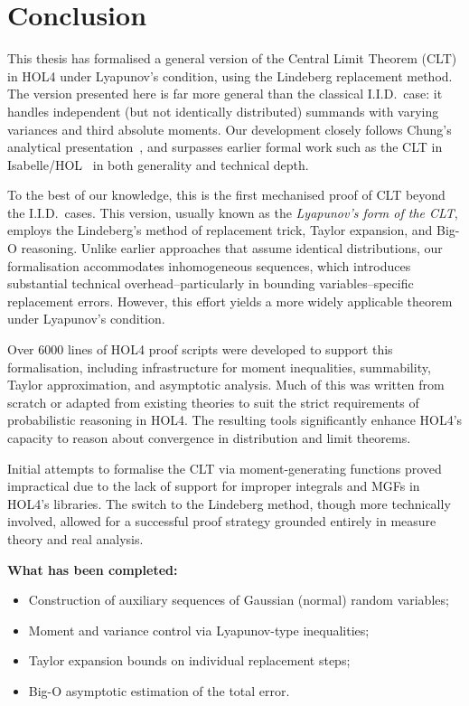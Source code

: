\chapter{Conclusion}
\label{concl}

This thesis has formalised a general version of the Central Limit Theorem (CLT) in HOL4 under Lyapunov's condition, using the Lindeberg replacement method. The version presented here is far more general than the classical I.I.D.~case: it handles independent (but not identically distributed) summands with varying variances and third absolute moments. Our development closely follows Chung's analytical presentation~\cite{Chung:2001}, and surpasses earlier formal work such as the CLT in Isabelle/HOL~\cite{serafin2015formally} in both generality and technical depth.

To the best of our knowledge, this is the first mechanised proof of CLT beyond the I.I.D.~cases.
This version, usually known as the \emph{Lyapunov's form of the CLT}, employs the Lindeberg's method of replacement trick, Taylor expansion, and Big-O reasoning. Unlike earlier approaches that assume identical distributions, our formalisation accommodates inhomogeneous sequences, which introduces substantial technical overhead--particularly in bounding variables--specific replacement errors. However, this effort yields a more widely applicable theorem under Lyapunov’s condition.

Over 6000 lines of HOL4 proof scripts were developed to support this formalisation, including infrastructure for moment inequalities, summability, Taylor approximation, and asymptotic analysis. Much of this was written from scratch or adapted from existing theories to suit the strict requirements of probabilistic reasoning in HOL4. The resulting tools significantly enhance HOL4’s capacity to reason about convergence in distribution and limit theorems.

Initial attempts to formalise the CLT via moment-generating functions proved impractical due to the lack of support for improper integrals and MGFs in HOL4’s libraries. The switch to the Lindeberg method, though more technically involved, allowed for a successful proof strategy grounded entirely in measure theory and real analysis.

\medskip

\textbf{What has been completed:}
\begin{itemize}
    \item Construction of auxiliary sequences of Gaussian (normal) random variables;
    \item Moment and variance control via Lyapunov-type inequalities;
    \item Taylor expansion bounds on individual replacement steps;
    \item Big-O asymptotic estimation of the total error.
\end{itemize}

